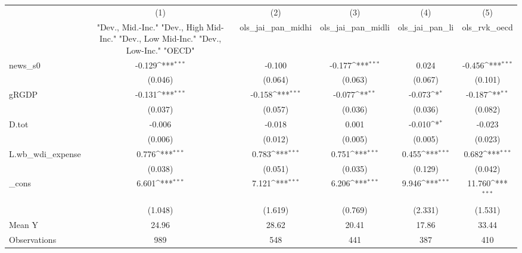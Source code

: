 {
\def\sym#1{\ifmmode^{#1}\else\(^{#1}\)\fi}
\begin{tabular}{l*{5}{c}}
\toprule
            &\multicolumn{1}{c}{(1)}&\multicolumn{1}{c}{(2)}&\multicolumn{1}{c}{(3)}&\multicolumn{1}{c}{(4)}&\multicolumn{1}{c}{(5)}\\
            &\multicolumn{1}{c}{ "Dev., Mid.-Inc." "Dev., High Mid-Inc." "Dev., Low Mid-Inc." "Dev., Low-Inc." "OECD" }&\multicolumn{1}{c}{ols\_jai\_pan\_midhi}&\multicolumn{1}{c}{ols\_jai\_pan\_midli}&\multicolumn{1}{c}{ols\_jai\_pan\_li}&\multicolumn{1}{c}{ols\_rvk\_oecd}\\
\midrule
news\_s0     &      -0.129\sym{***}&      -0.100         &      -0.177\sym{***}&       0.024         &      -0.456\sym{***}\\
            &     (0.046)         &     (0.064)         &     (0.063)         &     (0.067)         &     (0.101)         \\
\addlinespace
gRGDP       &      -0.131\sym{***}&      -0.158\sym{***}&      -0.077\sym{**} &      -0.073\sym{*}  &      -0.187\sym{**} \\
            &     (0.037)         &     (0.057)         &     (0.036)         &     (0.036)         &     (0.082)         \\
\addlinespace
D.tot       &      -0.006         &      -0.018         &       0.001         &      -0.010\sym{*}  &      -0.023         \\
            &     (0.006)         &     (0.012)         &     (0.005)         &     (0.005)         &     (0.023)         \\
\addlinespace
L.wb\_wdi\_expense&       0.776\sym{***}&       0.783\sym{***}&       0.751\sym{***}&       0.455\sym{***}&       0.682\sym{***}\\
            &     (0.038)         &     (0.051)         &     (0.035)         &     (0.129)         &     (0.042)         \\
\addlinespace
\_cons      &       6.601\sym{***}&       7.121\sym{***}&       6.206\sym{***}&       9.946\sym{***}&      11.760\sym{***}\\
            &     (1.048)         &     (1.619)         &     (0.769)         &     (2.331)         &     (1.531)         \\
\midrule
Mean Y      &       24.96         &       28.62         &       20.41         &       17.86         &       33.44         \\
Observations&         989         &         548         &         441         &         387         &         410         \\
\bottomrule
\end{tabular}
}
